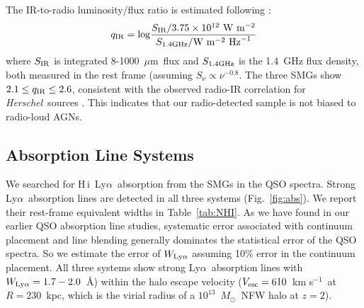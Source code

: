 \documentclass[iop,revtex4,twocolumn,apj,numberedappendix,appendixfloats]{emulateapj}
\newcommand{\hers}{{\it Herschel}}
\newcommand{\kms}{{km s$^{-1}$}}
\newcommand{\msun}{$M_{\odot}$}
\newcommand{\um}{$\mu$m}
\newcommand{\lya}{Ly$\alpha$}
\newcommand{\HI}{H\,{\sc i}}
\begin{document}
The IR-to-radio luminosity/flux ratio is estimated following \citet{Ivison10c}:
\begin{equation}
q_{\rm IR} = {\rm log} \frac{S_{\rm IR}/3.75\times10^{12}~{\rm W}~{\rm m}^{-2}}{S_{\rm 1.4 GHz}/{\rm W}~{\rm m}^{-2}~{\rm Hz}^{-1}}
\end{equation}
where $S_{\rm IR}$ is integrated 8-1000~\um\ flux and $S_{\rm 1.4GHz}$ is the 1.4~GHz flux density, both measured in the rest frame (assuming $S_\nu \propto \nu^{-0.8}$. The three SMGs show $2.1 \leq q_{\rm IR} \leq 2.6$, consistent with the observed radio-IR correlation for \hers\ sources \citep[$q_{\rm IR} = 2.4\pm0.5$;][]{Ivison10c}. This indicates that our radio-detected sample is not biased to radio-loud AGNs.

\subsection{Absorption Line Systems}



We searched for \HI\ \lya\ absorption from the SMGs in the QSO spectra. Strong \lya\ absorption lines are detected in all three systems (Fig.~\ref{fig:abs}). We report their rest-frame equivalent widths in Table~\ref{tab:NHI}. As we have found in our earlier QSO absorption line studies, systematic error associated with continuum placement and line blending generally dominates the statistical error of the QSO spectra. So we estimate the error of $W_{\rm Ly\alpha}$ assuming 10\% error in the continuum placement. All three systems show strong \lya\ absorption lines with $W_{\rm Ly\alpha} = 1.7-2.0$~\AA) within the halo escape velocity ($V_{\rm esc} = 610$~\kms\ at $R = 230$~kpc, which is the virial radius of a $10^{13}$~\msun\ NFW halo at $z = 2$).
\end{document}
